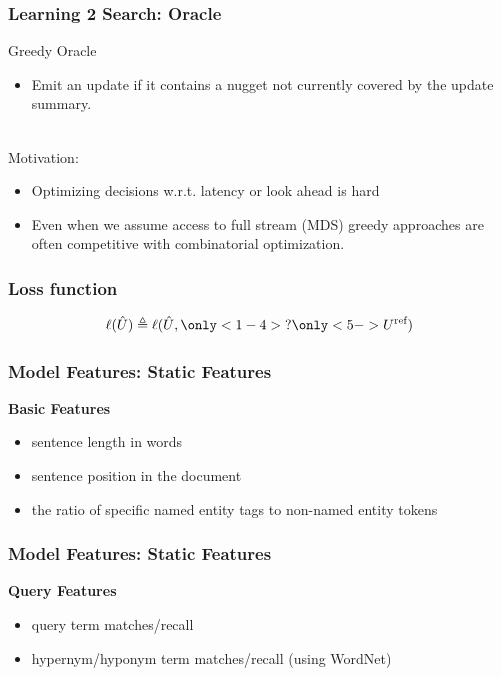 \documentclass{beamer}
\begin{document}
\begin{frame}
    \frametitle{Learning 2 Search: Oracle}

    Greedy Oracle
    \begin{itemize}
        \item Emit an update if it contains a nugget not currently covered 
            by the update summary.
    \end{itemize}
      ~\\
     Motivation:
            \begin{itemize}
                \item Optimizing decisions w.r.t. latency or look ahead is 
                    hard
                \item Even when we assume access to full stream (MDS) greedy
                    approaches are often competitive with combinatorial
                    optimization.
            \end{itemize}

\end{frame}

\begin{frame}
    \frametitle{Loss function}

    \[\ell(\hat{U}) \triangleq \ell(\hat{U}, \only<1-4>{?} \only<5->{U^{\textrm{ref}} }) \]


\end{frame}

\begin{frame}
    \frametitle{Model Features: Static Features}


 \textbf{Basic Features } 
    \begin{itemize}
        \item sentence length in words
        \item sentence position in the document
        \item the ratio of specific named entity tags to non-named entity 
            tokens
    \end{itemize}
\end{frame}
\begin{frame}
    \frametitle{Model Features: Static Features}
 \textbf{Query Features } 
    \begin{itemize}
    \item query term matches/recall
    \item hypernym/hyponym term matches/recall (using WordNet)
    \end{itemize}
\end{frame}
\end{document}
